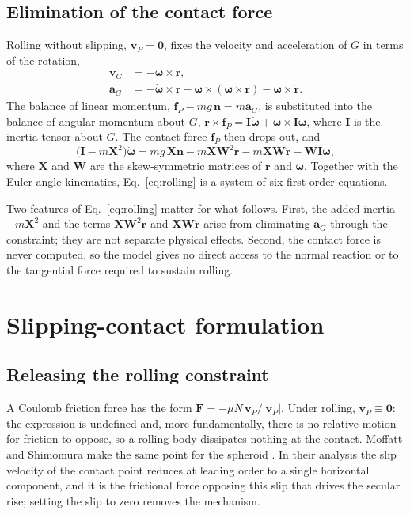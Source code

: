 \documentclass[aps,pre,twocolumn,superscriptaddress,amsmath,amssymb,floatfix,nofootinbib]{revtex4-2}
\newcommand{\rpg}{\bm{r}}
\newcommand{\ve}[1]{\bm{#1}}
\newcommand{\rdot}{\mathring{\bm r}}
\begin{document}
\subsection{Elimination of the contact force}

Rolling without slipping, $\ve v_P=\ve 0$, fixes the velocity and acceleration of $G$ in
terms of the rotation,
\begin{align}
\ve v_G&=-\bm\omega\times\rpg,\label{eq:rollingvG}\\
\ve a_G&=-\dot{\bm\omega}\times\rpg-\bm\omega\times(\bm\omega\times\rpg)
          -\bm\omega\times\rdot.\label{eq:rollingaG}
\end{align}
The balance of linear momentum, $\ve f_P-mg\,\ve n=m\ve a_G$, is substituted into the
balance of angular momentum about $G$,
$\rpg\times\ve f_P=\ve I\dot{\bm\omega}+\bm\omega\times\ve I\bm\omega$, where $\ve I$ is
the inertia tensor about $G$. The contact force $\ve f_P$ then drops out, and
\cite{Kane1982,Mukherjee}
\begin{equation}
\bigl(\ve I-m\ve X^2\bigr)\dot{\bm\omega}=mg\,\ve X\ve n-m\ve X\ve W^2\rpg
-m\ve X\ve W\rdot-\ve W\ve I\bm\omega,
\label{eq:rolling}
\end{equation}
where $\ve X$ and $\ve W$ are the skew-symmetric matrices of $\rpg$ and $\bm\omega$.
Together with the Euler-angle kinematics, Eq.~\eqref{eq:rolling} is a system of six
first-order equations.

Two features of Eq.~\eqref{eq:rolling} matter for what follows. First, the added inertia
$-m\ve X^2$ and the terms $\ve X\ve W^2\rpg$ and $\ve X\ve W\rdot$ arise from eliminating
$\ve a_G$ through the constraint; they are not separate physical effects. Second, the
contact force is never computed, so the model gives no direct access to the normal
reaction or to the tangential force required to sustain rolling.

\section{Slipping-contact formulation}\label{sec:slip}

\subsection{Releasing the rolling constraint}

A Coulomb friction force has the form $\ve F=-\mu N\,\ve v_P/|\ve v_P|$. Under rolling,
$\ve v_P\equiv\ve 0$: the expression is undefined and, more fundamentally, there is no
relative motion for friction to oppose, so a rolling body dissipates nothing at the
contact. Moffatt and Shimomura make the same point for the spheroid \cite{Moffatt2002}.
In their analysis the slip velocity of the contact point reduces at leading order to a
single horizontal component, and it is the frictional force opposing this slip that
drives the secular rise; setting the slip to zero removes the mechanism.
\end{document}

